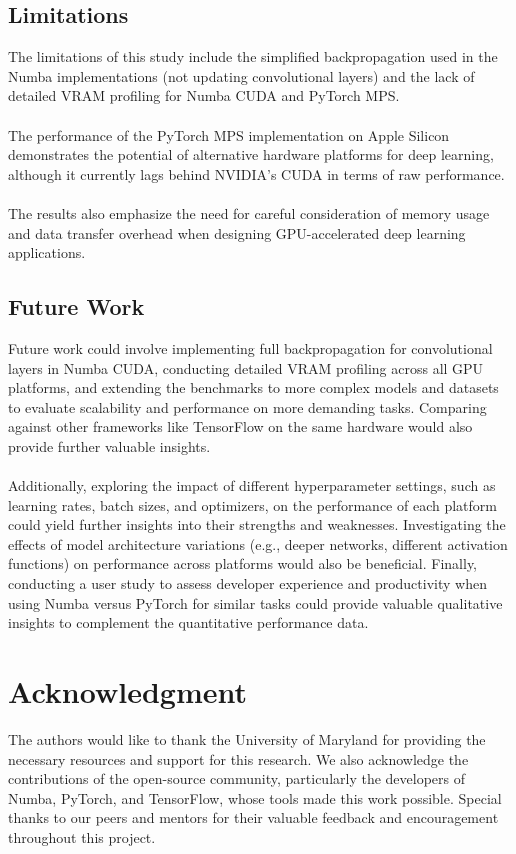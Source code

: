 \documentclass[conference]{IEEEtran} %
\begin{document}
\subsection{Limitations}
\label{sec:limitations}
The limitations of this study include the simplified backpropagation used in the Numba implementations (not updating convolutional layers) and the lack of detailed VRAM profiling for Numba CUDA and PyTorch MPS.
\\
\\
The performance of the PyTorch MPS implementation on Apple Silicon demonstrates the potential of alternative hardware platforms for deep learning, although it currently lags behind NVIDIA's CUDA in terms of raw performance. 
\\
\\
The results also emphasize the need for careful consideration of memory usage and data transfer overhead when designing GPU-accelerated deep learning applications.

\subsection{Future Work}
\label{sec:future_work}
Future work could involve implementing full backpropagation for convolutional layers in Numba CUDA, conducting detailed VRAM profiling across all GPU platforms, and extending the benchmarks to more complex models and datasets to evaluate scalability and performance on more demanding tasks. Comparing against other frameworks like TensorFlow on the same hardware would also provide further valuable insights.
\\
\\
Additionally, exploring the impact of different hyperparameter settings, such as learning rates, batch sizes, and optimizers, on the performance of each platform could yield further insights into their strengths and weaknesses. Investigating the effects of model architecture variations (e.g., deeper networks, different activation functions) on performance across platforms would also be beneficial. Finally, conducting a user study to assess developer experience and productivity when using Numba versus PyTorch for similar tasks could provide valuable qualitative insights to complement the quantitative performance data.

\section*{Acknowledgment} %
The authors would like to thank the University of Maryland for providing the necessary resources and support for this research. We also acknowledge the contributions of the open-source community, particularly the developers of Numba, PyTorch, and TensorFlow, whose tools made this work possible. Special thanks to our peers and mentors for their valuable feedback and encouragement throughout this project.
\end{document}
